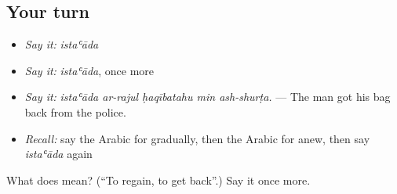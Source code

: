 \subsection*{Your turn}
\begin{itemize}
\raggedright
  \item \emph{Say it:} \emph{istaʿāda}
  \item \emph{Say it:} \emph{istaʿāda}, once more
  \item \emph{Say it:} \emph{istaʿāda ar-rajul ḥaqībatahu min ash-shurṭa.} — The man got his bag back from the police.
  \item \emph{Recall:} say the Arabic for gradually, then the Arabic for anew, then say \emph{istaʿāda} again
\end{itemize}

\begin{tcolorbox}[breakable,colback=teal!4,colframe=teal!35!black,title={Before you move on}]
What does  mean? (\textquotedblleft{}To regain, to get back\textquotedblright{}.) Say it once more.
\end{tcolorbox}
